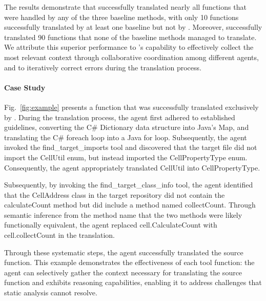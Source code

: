 The results demonstrate that \toolname successfully translated nearly all functions that were handled by any of the three baseline methods, with only 10 functions successfully translated by at least one baseline but not by \toolname. Moreover, \toolname successfully translated 90 functions that none of the baseline methods managed to translate. We attribute this superior performance to \toolname's capability to effectively collect the most relevant context through collaborative coordination among different agents, and to iteratively correct errors during the translation process.

\paragraph{Case Study} Fig.~\ref{fig:example} presents a function that was successfully translated exclusively by \toolname. During the translation process, the agent first adhered to established guidelines, converting the C\# Dictionary data structure into Java's Map, and translating the C\# foreach loop into a Java for loop. Subsequently, the agent invoked the find\_target\_imports tool and discovered that the target file did not import the CellUtil enum, but instead imported the CellPropertyType enum. Consequently, the agent appropriately translated CellUtil into CellPropertyType.

Subsequently, by invoking the find\_target\_class\_info tool, the agent identified that the CellAddress class in the target repository did not contain the calculateCount method but did include a method named collectCount. Through semantic inference from the method name that the two methods were likely functionally equivalent, the agent replaced cell.CalculateCount with cell.collectCount in the translation.

Through these systematic steps, the agent successfully translated the source function. This example demonstrates the effectiveness of each tool function: the agent can selectively gather the context necessary for translating the source function and exhibits reasoning capabilities, enabling it to address challenges that static analysis cannot resolve.






